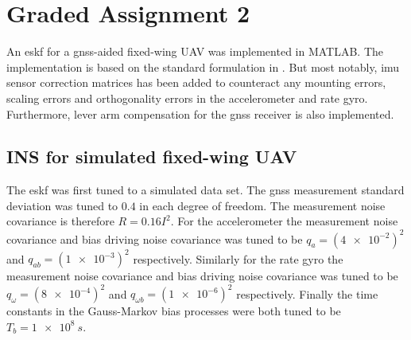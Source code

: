 \section{Graded Assignment 2}\label{sec:graded_assignment_2}


An \acrfull{eskf} for a \acrshort{gnss}-aided fixed-wing UAV was implemented in MATLAB. The implementation is based on the standard formulation in \cite{Sola}. But most notably, \acrshort{imu} sensor correction matrices has been added to counteract any mounting errors, scaling errors and orthogonality errors in the accelerometer and rate gyro. Furthermore, lever arm compensation for the \acrshort{gnss} receiver is also implemented.

\subsection{INS for simulated fixed-wing UAV}





The \acrshort{eskf} was first tuned to a simulated data set. The \acrshort{gnss} measurement standard deviation was tuned to $0.4$ in each degree of freedom. The measurement noise covariance is therefore $R=0.16 I ^2$. For the accelerometer the measurement noise covariance and bias driving noise covariance was tuned to be $q_{a} = (\SI{4e-2})^2$ and $ q_{ab} = (\SI{1e-3})^2$ respectively. Similarly for the rate gyro the measurement noise covariance and bias driving noise covariance was tuned to be $q_{\omega} = (\SI{8e-4})^2$ and $q_{\omega b} = (\SI{1e-6})^2$ respectively. Finally the time constants in the Gauss-Markov bias processes were both tuned to be $T_b = \SI{1e8}{s}$.

